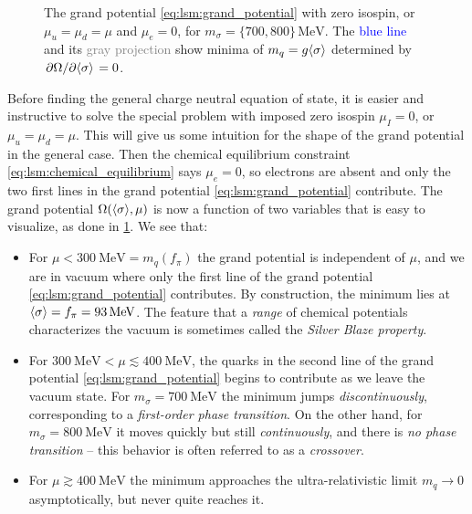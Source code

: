 \begin{figure}
\caption{\label{fig:lsm:grand-potential-noisospin}%
	The grand potential \eqref{eq:lsm:grand_potential} with zero isospin, or $\mu_u = \mu_d = \mu$ and $\mu_e=0$, for $m_\sigma=\{700,800\} \, \si{\mega\electronvolt}$.
	The \textcolor{blue}{blue line} and its \textcolor{gray}{gray projection} show minima of $m_q = g \langle \sigma \rangle$ determined by $\pdv{\Omega}/{\langle \sigma \rangle} = 0$.
}
\end{figure}

Before finding the general charge neutral equation of state,
it is easier and instructive to solve the special problem with imposed zero isospin $\mu_I=0$, or $\mu_u=\mu_d=\mu$.
This will give us some intuition for the shape of the grand potential in the general case.
Then the chemical equilibrium constraint \eqref{eq:lsm:chemical_equilibrium} says $\mu_e=0$,
so electrons are absent and only the two first lines in the grand potential \eqref{eq:lsm:grand_potential} contribute.
The grand potential $\Omega(\langle \sigma \rangle,\mu)$ is now a function of two variables that is easy to visualize, as done in \cref{fig:lsm:grand-potential-noisospin}.
We see that:
\begin{itemize}
\item For $\mu < \SI{300}{\mega\electronvolt} = m_q(f_\pi)$ the grand potential is independent of $\mu$,
      and we are in vacuum where only the first line of the grand potential \eqref{eq:lsm:grand_potential} contributes.
      By construction, the minimum lies at $\langle \sigma \rangle = f_\pi = \SI{93}{\mega\electronvolt}$.
      The feature that a \emph{range} of chemical potentials characterizes the vacuum is sometimes called the \emph{Silver Blaze property}.
\item For $\SI{300}{\mega\electronvolt} < \mu \lesssim \SI{400}{\mega\electronvolt}$,
      the quarks in the second line of the grand potential \eqref{eq:lsm:grand_potential} begins to contribute as we leave the vacuum state.
      For $m_\sigma = \SI{700}{\mega\electronvolt}$ the minimum jumps \emph{discontinuously}, corresponding to a \emph{first-order phase transition}.
      On the other hand, for $m_\sigma = \SI{800}{\mega\electronvolt}$ it moves quickly but still \emph{continuously}, and there is \emph{no phase transition}
      -- this behavior is often referred to as a \emph{crossover}.
\item For $\mu \gtrsim \SI{400}{\mega\electronvolt}$ the minimum approaches the ultra-relativistic limit $m_q \rightarrow 0$ asymptotically, but never quite reaches it.
\end{itemize}

